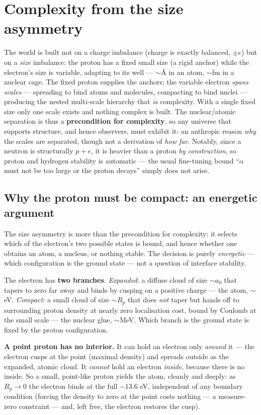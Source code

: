 \documentclass[11pt]{article}
\begin{document}
\section{Complexity from the size asymmetry}\label{sec:complexity}
The world is built not on a charge imbalance (charge is exactly balanced, $\pm e$) but on a \emph{size} imbalance:
the proton has a fixed small size (a rigid anchor) while the electron's size is variable, adapting to its well ---
${\sim}$\AA{} in an atom, ${\sim}$fm in a nuclear cage. The fixed proton supplies the anchors; the variable
electron \emph{spans scales} --- spreading to bind atoms and molecules, compacting to bind nuclei --- producing the
nested multi-scale hierarchy that \emph{is} complexity. With a single fixed size only one scale exists and nothing
complex is built. The nuclear/atomic separation is thus a \textbf{precondition for complexity}, so any universe
that supports structure, and hence observers, must exhibit it: an anthropic reason \emph{why} the scales are
separated, though not a derivation of \emph{how far}. Notably, since a neutron is structurally $p+e$, it is heavier
than a proton \emph{by construction}, so proton and hydrogen stability is automatic --- the usual fine-tuning
bound ``$\alpha$ must not be too large or the proton decays'' simply does not arise.

\subsection*{Why the proton must be compact: an energetic argument}
The size asymmetry is more than the precondition for complexity: it selects which of the electron's two possible
states is bound, and hence whether one obtains an atom, a nucleus, or nothing stable. The decision is purely
\emph{energetic} --- which configuration is the ground state --- not a question of interface stability.

The electron has \textbf{two branches}. \emph{Expanded}: a diffuse cloud of size ${\sim}a_0$ that tapers to zero
far away and binds by cusping on a positive charge --- the atom, ${\sim}$eV. \emph{Compact}: a small cloud of size
${\sim}R_p$ that does \emph{not} taper but hands off to surrounding proton density at nearly zero localisation
cost, bound by Coulomb at the small scale --- the nuclear glue, ${\sim}$MeV. Which branch is the ground state is
fixed by the proton configuration.

\textbf{A point proton has no interior.} It can hold an electron only \emph{around} it --- the electron cusps at
the point (maximal density) and spreads outside as the expanded, atomic cloud. It \emph{cannot} hold an electron
\emph{inside}, because there is no inside. So a small, point-like proton yields the atom, cleanly and deeply: as
$R_p\to0$ the electron binds at the full $-13.6$ eV, independent of any boundary condition (forcing the density to
zero at the point costs nothing --- a measure-zero constraint --- and, left free, the electron restores the cusp).
\end{document}
